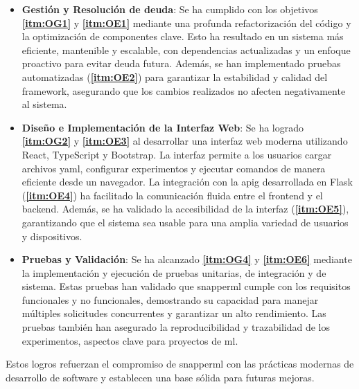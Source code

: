 \begin{itemize}
    \item \textbf{Gestión y Resolución de \Gls{deuda}}: Se ha cumplido con los objetivos \textbf{\ref{itm:OG1}} y \textbf{\ref{itm:OE1}} mediante una profunda refactorización del código y la optimización de componentes clave. Esto ha resultado en un sistema más eficiente, mantenible y escalable, con dependencias actualizadas y un enfoque proactivo para evitar \gls{deuda} futura. Además, se han implementado pruebas automatizadas (\textbf{\ref{itm:OE2}}) para garantizar la estabilidad y calidad del \gls{framework}, asegurando que los cambios realizados no afecten negativamente al sistema.

    \item \textbf{Diseño e Implementación de la Interfaz Web}: Se ha logrado \textbf{\textbf{\ref{itm:OG2}}} y \textbf{\textbf{\ref{itm:OE3}}} al desarrollar una interfaz web moderna utilizando React, TypeScript y Bootstrap. La interfaz permite a los usuarios cargar archivos \acrshort{yaml}, configurar experimentos y ejecutar comandos de manera eficiente desde un navegador. La integración con la \Gls{apig} desarrollada en Flask (\textbf{\ref{itm:OE4}}) ha facilitado la comunicación fluida entre el \gls{frontend} y el \gls{backend}. Además, se ha validado la accesibilidad de la interfaz (\textbf{\ref{itm:OE5}}), garantizando que el sistema sea usable para una amplia variedad de usuarios y dispositivos.

    \item \textbf{Pruebas y Validación}: Se ha alcanzado \textbf{\textbf{\ref{itm:OG4}}} y \textbf{\textbf{\ref{itm:OE6}}} mediante la implementación y ejecución de pruebas unitarias, de integración y de sistema. Estas pruebas han validado que \Gls{snapperml} cumple con los requisitos funcionales y no funcionales, demostrando su capacidad para manejar múltiples solicitudes concurrentes y garantizar un alto rendimiento. Las pruebas también han asegurado la reproducibilidad y trazabilidad de los experimentos, aspectos clave para proyectos de \acrlong{ml}.

\end{itemize}
Estos logros refuerzan el compromiso de \Gls{snapperml} con las prácticas modernas de desarrollo de software y establecen una base sólida para futuras mejoras.

